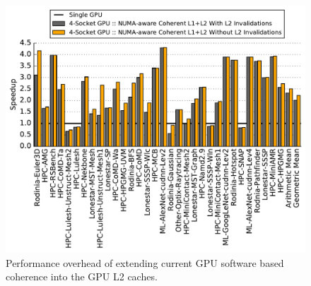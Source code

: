 \begin{figure}[t]
    \centering
    \includegraphics[width=1.0\columnwidth]{figures/plot_no_inval_WB.pdf}
    \caption{Performance overhead of extending current GPU software based coherence
    into the GPU L2 caches.}
    \label{fig:invalidations}
    \vspace{-.2in}
\end{figure}


